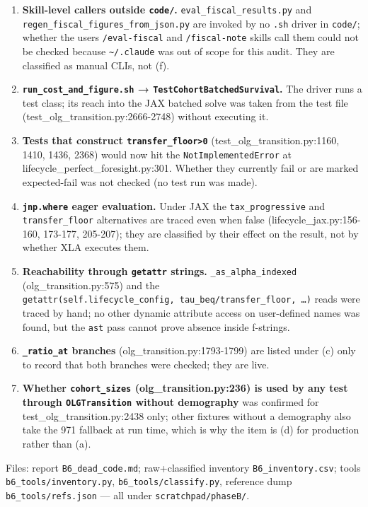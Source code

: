 

\begin{enumerate}
\def\labelenumi{\arabic{enumi}.}
\tightlist
\item
  \textbf{Skill-level callers outside \texttt{code/}.}
  \texttt{eval\_fiscal\_results.py} and
  \texttt{regen\_fiscal\_figures\_from\_json.py} are invoked by no
  \texttt{.sh} driver in \texttt{code/}; whether the
  user\textquotesingle s \texttt{/eval-fiscal} and \texttt{/fiscal-note}
  skills call them could not be checked because
  \texttt{\textasciitilde{}/.claude} was out of scope for this audit.
  They are classified as manual CLIs, not (f).
\item
  \textbf{\texttt{run\_cost\_and\_figure.sh} →
  \texttt{TestCohortBatchedSurvival}.} The driver runs a test class; its
  reach into the JAX batched solve was taken from the test file
  (test\_olg\_transition.py:2666-2748) without executing it.
\item
  \textbf{Tests that construct \texttt{transfer\_floor\textgreater{}0}}
  (test\_olg\_transition.py:1160, 1410, 1436, 2368) would now hit the
  \texttt{NotImplementedError} at lifecycle\_perfect\_foresight.py:301.
  Whether they currently fail or are marked expected-fail was not
  checked (no test run was made).
\item
  \textbf{\texttt{jnp.where} eager evaluation.} Under JAX the
  \texttt{tax\_progressive} and \texttt{transfer\_floor} alternatives
  are traced even when false (lifecycle\_jax.py:156-160, 173-177,
  205-207); they are classified by their effect on the result, not by
  whether XLA executes them.
\item
  \textbf{Reachability through \texttt{getattr} strings.}
  \texttt{\_as\_alpha\_indexed} (olg\_transition.py:575) and the
  \texttt{getattr(self.lifecycle\_config,\ \textquotesingle{}tau\_beq\textquotesingle{}/\textquotesingle{}transfer\_floor\textquotesingle{},\ …)}
  reads were traced by hand; no other dynamic attribute access on
  user-defined names was found, but the \texttt{ast} pass cannot prove
  absence inside f-strings.
\item
  \textbf{\texttt{\_ratio\_at} branches} (olg\_transition.py:1793-1799)
  are listed under (c) only to record that both branches were checked;
  they are live.
\item
  \textbf{Whether \texttt{cohort\_sizes} (olg\_transition.py:236) is
  used by any test through \texttt{OLGTransition} without demography}
  was confirmed for test\_olg\_transition.py:2438 only; other fixtures
  without a demography also take the 971 fallback at run time, which is
  why the item is (d) for production rather than (a).
\end{enumerate}

Files: report \texttt{B6\_dead\_code.md}; raw+classified inventory
\texttt{B6\_inventory.csv}; tools \texttt{b6\_tools/inventory.py},
\texttt{b6\_tools/classify.py}, reference dump
\texttt{b6\_tools/refs.json} --- all under \texttt{scratchpad/phaseB/}.
